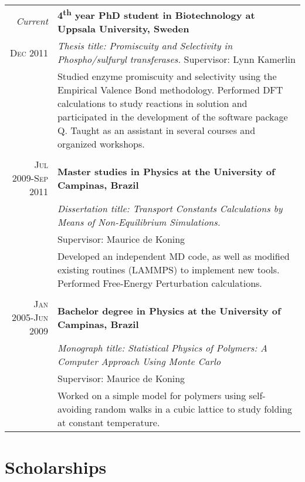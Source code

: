 \documentclass[a4paper,10pt]{article} %
\begin{document}
\begin{tabular}{r|p{11cm}}
\emph{Current} & \textbf{ 4\textsuperscript{th} year PhD student in Biotechnology at Uppsala University, Sweden} \\
\textsc{Dec 2011} & \emph{Thesis title: Promiscuity and Selectivity in Phospho/sulfuryl transferases.} Supervisor: Lynn Kamerlin \\ 
& \footnotesize{Studied enzyme promiscuity and selectivity using the Empirical Valence Bond methodology. Performed DFT calculations to study reactions in solution and participated in the development of the software package Q. Taught as an assistant in several courses and organized workshops.}\\
\multicolumn{2}{c}{} \\


\textsc{Jul 2009-Sep 2011} & \textbf{Master studies in Physics at the University of Campinas, Brazil}\\
& \emph{Dissertation title: Transport Constants Calculations by Means of Non-Equilibrium Simulations.} \\ &  Supervisor: Maurice de Koning\\
& \footnotesize{Developed an independent MD code, as well as modified existing routines (LAMMPS) to implement new tools. Performed Free-Energy Perturbation calculations.} \\
\multicolumn{2}{c}{} \\


\textsc{Jan 2005-Jun 2009} & \textbf{Bachelor degree in Physics at the University of Campinas, Brazil} \emph{}\\
& \emph{Monograph title: Statistical Physics of Polymers: A Computer Approach Using Monte Carlo} \\ & Supervisor: Maurice de Koning \\ 
& \footnotesize{Worked on a simple model for polymers using self-avoiding random walks in a cubic lattice to study folding at constant temperature.}
\end{tabular}


\section{Scholarships}
\end{document}
